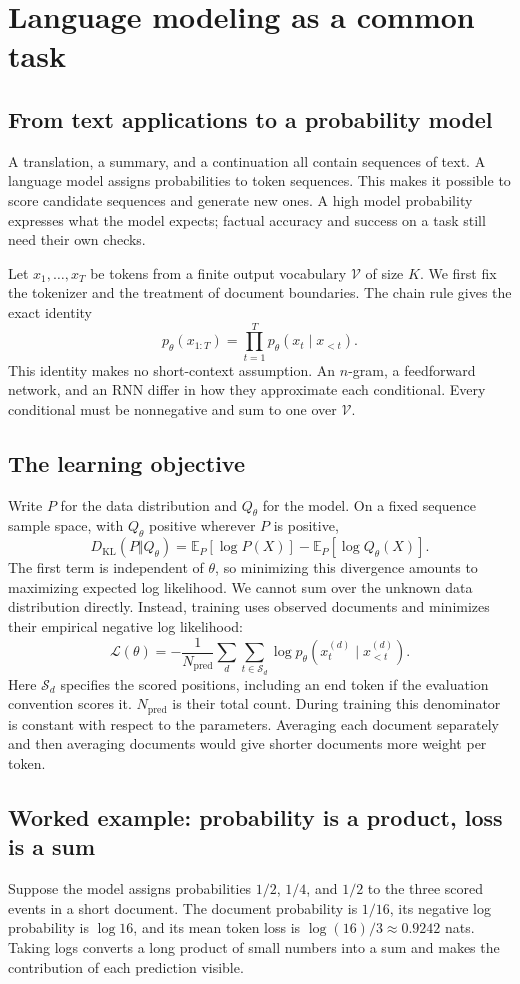 \clearpage
\section{Language modeling as a common task}\label{sec:task}
\subsection*{From text applications to a probability model}
A translation, a summary, and a continuation all contain sequences of text.
A language model assigns probabilities to token sequences. This makes it
possible to score candidate sequences and generate new ones. A high model
probability expresses what the model expects; factual accuracy and success
on a task still need their own checks.

Let $x_1,\ldots,x_T$ be tokens from a finite output vocabulary
$\mathcal V$ of size $K$. We first fix the tokenizer and the treatment of
document boundaries. The chain rule gives the exact identity
\[
 p_\theta(x_{1:T})=\prod_{t=1}^{T}p_\theta(x_t\mid x_{<t}).
\]
This identity makes no short-context assumption. An $n$-gram, a feedforward
network, and an RNN differ in how they approximate each conditional.
Every conditional must be nonnegative and sum to one over $\mathcal V$.

\subsection*{The learning objective}
Write $P$ for the data distribution and $Q_\theta$ for the model. On a
fixed sequence sample space, with $Q_\theta$ positive wherever $P$ is positive,
\[
 D_{\mathrm{KL}}(P\Vert Q_\theta)
 =\mathbb E_P[\log P(X)]-\mathbb E_P[\log Q_\theta(X)].
\]
The first term is independent of $\theta$, so minimizing this divergence
amounts to maximizing expected log likelihood. We cannot sum over the
unknown data distribution directly. Instead, training uses observed documents
and minimizes their empirical negative log likelihood:
\[
 \mathcal L(\theta)=-\frac{1}{N_{\mathrm{pred}}}
 \sum_{d}\sum_{t\in\mathcal S_d}\log p_\theta(x_t^{(d)}\mid x_{<t}^{(d)}).
\]
Here $\mathcal S_d$ specifies the scored positions, including an end token
if the evaluation convention scores it. $N_{\mathrm{pred}}$ is their total
count. During training this denominator is constant with respect to the
parameters. Averaging each document separately and then averaging documents
would give shorter documents more weight per token.

\subsection*{Worked example: probability is a product, loss is a sum}
Suppose the model assigns probabilities $1/2$, $1/4$, and $1/2$ to the
three scored events in a short document. The document probability is $1/16$,
its negative log probability is $\log 16$, and its mean token loss is
$\log(16)/3\approx0.9242$ nats. Taking logs converts a long product of
small numbers into a sum and makes the contribution of each prediction visible.

